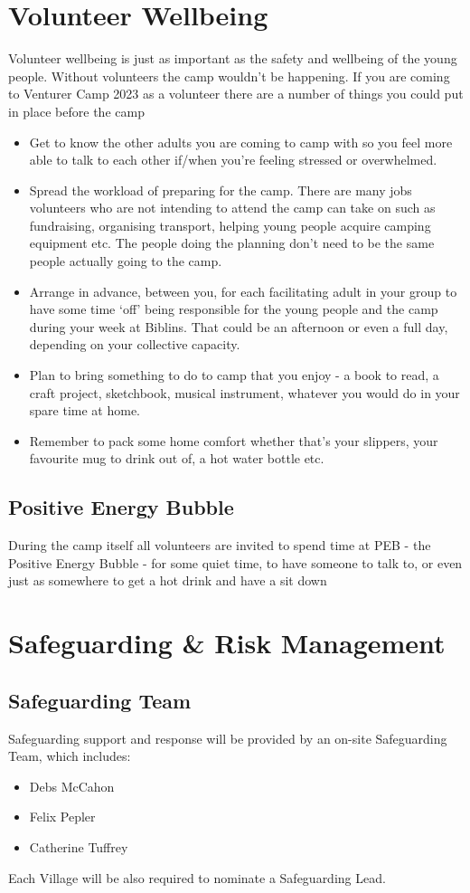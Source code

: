 \documentclass[a4paper, 11pt]{report}
\begin{document}
\chapter{Volunteer Wellbeing}
Volunteer wellbeing is just as important as the safety and wellbeing of the young people. Without volunteers the camp wouldn't be happening.
If you are coming to Venturer Camp 2023 as a volunteer there are a number of things you could put in place before the camp
\begin{itemize}
    \item Get to know the other adults you are coming to camp with so you feel more able to talk to each other if/when you're feeling stressed or overwhelmed.
    \item Spread the workload of preparing for the camp. There are many jobs volunteers who are not intending to attend the camp can take on such as fundraising, organising transport, helping young people acquire camping equipment etc. The people doing the planning don't need to be the same people actually going to the camp.
    \item Arrange in advance, between you, for each facilitating adult in your group to have some time `off' being responsible for the young people and the camp during your week at Biblins. That could be an afternoon or even a full day, depending on your collective capacity.
    \item Plan to bring something to do to camp that you enjoy - a book to read, a craft project, sketchbook, musical instrument, whatever you would do in your spare time at home.
    \item Remember to pack some home comfort whether that's your slippers, your favourite mug to drink out of, a hot water bottle etc.
\end{itemize}
\section{Positive Energy Bubble}
During the camp itself all volunteers are invited to spend time at PEB - the Positive Energy Bubble - for some quiet time, to have someone to talk to, or even just as somewhere to get a hot drink and have a sit down


\chapter{Safeguarding \& Risk Management}
\section{Safeguarding Team}
Safeguarding support and response will be provided by an on-site Safeguarding Team, which includes:
\begin{itemize}
    \item Debs McCahon
    \item Felix Pepler
    \item Catherine Tuffrey
\end{itemize}
Each Village will be also required to nominate a Safeguarding Lead.
\end{document}
